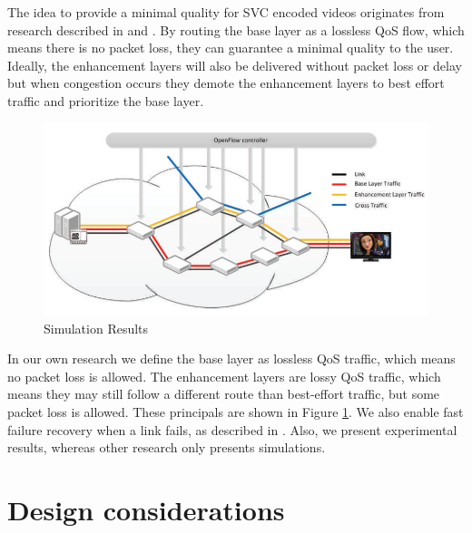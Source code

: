 \documentclass[conference]{IEEEtran}
\begin{document}
The idea to provide a minimal quality for SVC encoded videos originates from 
research described in \cite{egilmez2011scalable} and \cite{civanlar2010qos}. 
By routing the base layer as a lossless QoS flow, which means there is no packet loss, they can 
guarantee a minimal quality to the user. Ideally, the enhancement layers will also be delivered 
without packet loss or delay but when congestion occurs they demote the enhancement layers to best 
effort traffic and prioritize the base layer.\\

\begin{figure}[htb]
\centering
\includegraphics[width=\linewidth]{fig/SVC_OpenFlow_flow}
\caption{Simulation Results}
\label{fig_sim}
\end{figure}

In our own research we define the base layer as lossless QoS traffic, which means no packet loss is allowed.
The enhancement layers are lossy QoS traffic, which means they may still follow a different 
route than best-effort traffic, but some packet loss is allowed.
These principals are shown in Figure \ref{fig_sim}.
We also enable fast failure recovery when a link fails, as described in \cite{sharma2011enabling}.
Also, we present experimental results, whereas other research only presents simulations.\\

\section{Design considerations}
\end{document}
